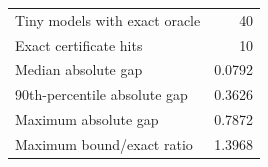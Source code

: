 \begin{tabular}{lr}\hline
Tiny models with exact oracle & 40 \\
Exact certificate hits & 10 \\
Median absolute gap & 0.0792 \\
90th-percentile absolute gap & 0.3626 \\
Maximum absolute gap & 0.7872 \\
Maximum bound/exact ratio & 1.3968 \\
\hline\end{tabular}
